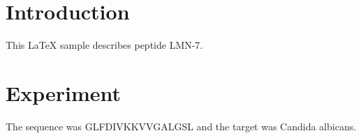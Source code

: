 \section{Introduction}
This LaTeX sample describes peptide LMN-7.

\section{Experiment}
The sequence was GLFDIVKKVVGALGSL and the target was Candida albicans.
